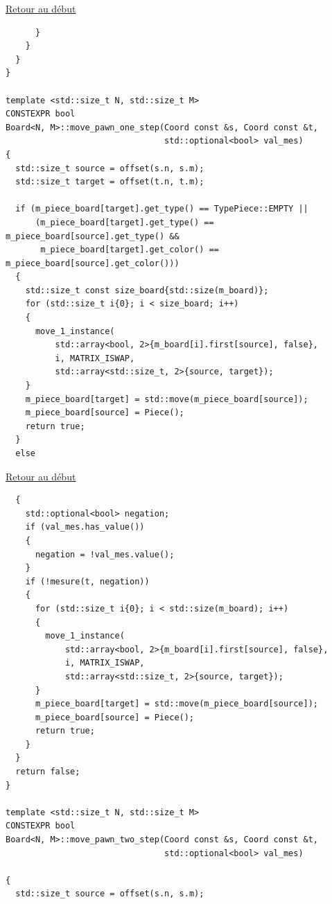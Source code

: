 {\begin{frame}[fragile]
\hyperlink{conclusion}{Retour au début}\newline
\begin{verbatim}
      }
    }
  }
}

template <std::size_t N, std::size_t M>
CONSTEXPR bool
Board<N, M>::move_pawn_one_step(Coord const &s, Coord const &t,
                                std::optional<bool> val_mes)
{
  std::size_t source = offset(s.n, s.m);
  std::size_t target = offset(t.n, t.m);

  if (m_piece_board[target].get_type() == TypePiece::EMPTY ||
      (m_piece_board[target].get_type() == m_piece_board[source].get_type() &&
       m_piece_board[target].get_color() == m_piece_board[source].get_color()))
  {
    std::size_t const size_board{std::size(m_board)};
    for (std::size_t i{0}; i < size_board; i++)
    {
      move_1_instance(
          std::array<bool, 2>{m_board[i].first[source], false},
          i, MATRIX_ISWAP,
          std::array<std::size_t, 2>{source, target});
    }
    m_piece_board[target] = std::move(m_piece_board[source]);
    m_piece_board[source] = Piece();
    return true;
  }
  else
\end{verbatim}
\end{frame}

\begin{frame}[fragile]
\hyperlink{conclusion}{Retour au début}\newline
\begin{verbatim}
  {
    std::optional<bool> negation;
    if (val_mes.has_value())
    {
      negation = !val_mes.value();
    }
    if (!mesure(t, negation))
    {
      for (std::size_t i{0}; i < std::size(m_board); i++)
      {
        move_1_instance(
            std::array<bool, 2>{m_board[i].first[source], false},
            i, MATRIX_ISWAP,
            std::array<std::size_t, 2>{source, target});
      }
      m_piece_board[target] = std::move(m_piece_board[source]);
      m_piece_board[source] = Piece();
      return true;
    }
  }
  return false;
}

template <std::size_t N, std::size_t M>
CONSTEXPR bool
Board<N, M>::move_pawn_two_step(Coord const &s, Coord const &t,
                                std::optional<bool> val_mes)

{
  std::size_t source = offset(s.n, s.m);
\end{verbatim}
\end{frame}

}
